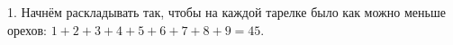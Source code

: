 1. Начнём раскладывать так, чтобы на каждой тарелке было как можно меньше орехов: $1+2+3+4+5+6+7+8+9=45.$\\
